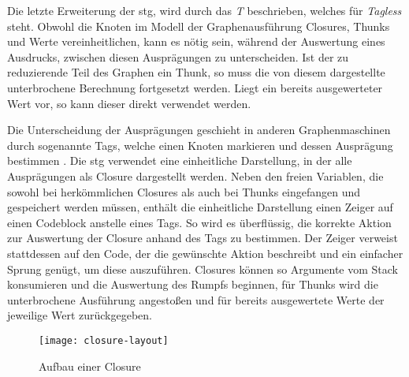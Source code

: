 Die letzte Erweiterung der \gls{stg}, wird durch das \textit{T} beschrieben, welches für \textit{Tagless} steht.
Obwohl die Knoten im Modell der Graphenausführung Closures, Thunks und Werte vereinheitlichen, kann es nötig sein, während der Auswertung eines Ausdrucks, zwischen diesen Ausprägungen zu unterscheiden.
Ist der zu reduzierende Teil des Graphen ein Thunk, so muss die von diesem dargestellte unterbrochene Berechnung fortgesetzt werden.
Liegt ein bereits ausgewerteter Wert vor, so kann dieser direkt verwendet werden.

Die Unterscheidung der Ausprägungen geschieht in anderen Graphenmaschinen durch sogenannte Tags, welche einen Knoten markieren und dessen Ausprägung bestimmen .
Die \gls{stg} verwendet eine einheitliche Darstellung, in der alle Ausprägungen als Closure dargestellt werden.
Neben den freien Variablen, die sowohl bei herkömmlichen Closures als auch bei Thunks eingefangen und gespeichert werden müssen, enthält die einheitliche Darstellung einen Zeiger auf einen Codeblock anstelle eines Tags.
So wird es überflüssig, die korrekte Aktion zur Auswertung der Closure anhand des Tags zu bestimmen.
Der Zeiger verweist stattdessen auf den Code, der die gewünschte Aktion beschreibt und ein einfacher Sprung genügt, um diese auszuführen.
Closures können so Argumente vom Stack konsumieren und die Auswertung des Rumpfs beginnen, für Thunks wird die unterbrochene Ausführung angestoßen und für bereits ausgewertete Werte der jeweilige Wert zurückgegeben.

\begin{figure}[h]
  \centering
  \texttt{[image: closure-layout]}
  \caption{Aufbau einer Closure}\label{fig:closure}
\end{figure}

